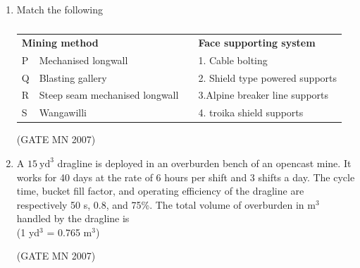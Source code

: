 \documentclass[journal]{IEEEtran}
\begin{document}
\begin{enumerate}
\item Match the following
\begin{table}[H]
    \centering\normalsize
\begin{tabular}{llcl}                             
\multicolumn{2}{l}{\textbf{Mining method    }} & & \textbf{Face supporting system} \\                       
P & Mechanised longwall     &  & 1. Cable bolting \\     
Q & Blasting gallery    &  & 2. Shield type powered supports \\                         
R & Steep seam mechanised longwall        &  & 3.Alpine breaker line supports     \\                                               
S & Wangawilli   &  & 4. troika shield supports \\                                          
\end{tabular}
\caption{}
    \label{tab:Q34}
\end{table}
\hfill (GATE MN 2007)
\begin{enumerate}
\end{enumerate}



\item A $15 \ \text{yd}^3$ dragline is deployed in an overburden bench of an opencast mine. It works for 40 days at the rate of 6 hours per shift and 3 shifts a day. The cycle time, bucket fill factor, and operating efficiency of the dragline are respectively 50 s, 0.8, and 75\%. The total volume of overburden in m$^3$ handled by the dragline is \\
(1 yd$^3$ = 0.765 m$^3$)

\hfill (GATE MN 2007)
\begin{enumerate}
\end{enumerate}




\end{enumerate}
\end{document}
